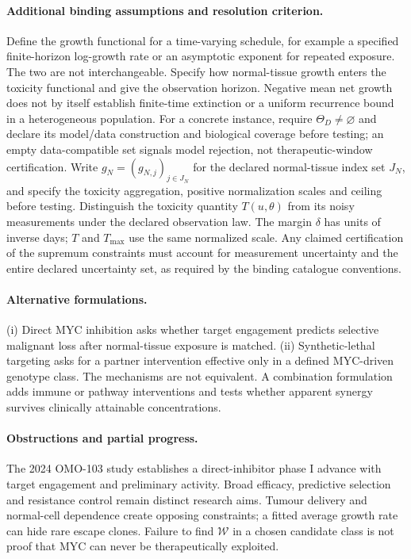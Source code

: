 \documentclass[11pt]{article}
\begin{document}
\paragraph{Additional binding assumptions and resolution criterion.} Define the growth functional for a time-varying schedule, for example a specified finite-horizon log-growth rate or an asymptotic exponent for repeated exposure. The two are not interchangeable. Specify how normal-tissue growth enters the toxicity functional and give the observation horizon. Negative mean net growth does not by itself establish finite-time extinction or a uniform recurrence bound in a heterogeneous population. For a concrete instance, require $\Theta_D\ne\varnothing$ and declare its model/data construction and biological coverage before testing; an empty data-compatible set signals model rejection, not therapeutic-window certification. Write $g_N=(g_{N,j})_{j\in J_N}$ for the declared normal-tissue index set $J_N$, and specify the toxicity aggregation, positive normalization scales and ceiling before testing. Distinguish the toxicity quantity $T(u,\theta)$ from its noisy measurements under the declared observation law. The margin $\delta$ has units of inverse days; $T$ and $T_{\max}$ use the same normalized scale. Any claimed certification of the supremum constraints must account for measurement uncertainty and the entire declared uncertainty set, as required by the binding catalogue conventions.

\paragraph{Alternative formulations.} (i) Direct MYC inhibition asks whether target engagement predicts selective malignant loss after normal-tissue exposure is matched. (ii) Synthetic-lethal targeting asks for a partner intervention effective only in a defined MYC-driven genotype class. The mechanisms are not equivalent. A combination formulation adds immune or pathway interventions and tests whether apparent synergy survives clinically attainable concentrations.

\paragraph{Obstructions and partial progress.} The 2024 OMO-103 study establishes a direct-inhibitor phase I advance with target engagement and preliminary activity. Broad efficacy, predictive selection and resistance control remain distinct research aims. Tumour delivery and normal-cell dependence create opposing constraints; a fitted average growth rate can hide rare escape clones. Failure to find $\mathcal W$ in a chosen candidate class is not proof that MYC can never be therapeutically exploited.
\end{document}
